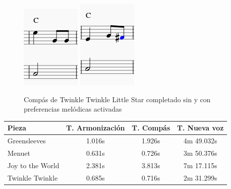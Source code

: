 \begin{figure}
   	\centering
   	\includegraphics[width=0.4\linewidth]{imagenes/evaluation/twinkle_measure.png}
   	\includegraphics[width=0.4\linewidth]{imagenes/evaluation/twinkle_measure_melodious.png}
   	\caption{Compás de Twinkle Twinkle Little Star completado sin y con preferencias melódicas activadas}
   	\label{fig:twinkle_measure}
\end{figure}

\begin{center}
	\begin{tabular}{ | l | c | c | c | }
		\hline
		Pieza 			& T. Armonización 	& T. Compás & T. Nueva voz \\ \hline \hline
		Greensleeves 	& 1.016s 			& 1.926s	& 4m 49.032s \\ \hline
		Menuet 			& 0.631s 			& 0.726s 	& 3m 50.376s \\ \hline
		Joy to the World& 2.381s 			& 3.813s	& 7m 17.115s \\ \hline
		Twinkle Twinkle & 0.685s 			& 0.716s 	& 2m 31.299s \\ \hline
	\end{tabular}
\end{center}

